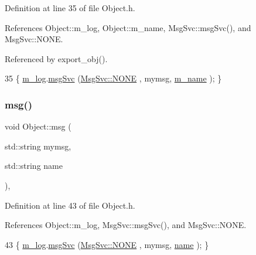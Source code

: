 Definition at line 35 of file Object.\+h.



References Object\+::m\+\_\+log, Object\+::m\+\_\+name, Msg\+Svc\+::msg\+Svc(), and Msg\+Svc\+::\+N\+O\+NE.



Referenced by export\+\_\+obj().


\begin{DoxyCode}
35 \{ \hyperlink{classObject_a0d269813dd7ac1f24bc143031e2963f2}{m\_log}.\hyperlink{classMsgSvc_ad25f18047920cc59a314e5098259711c}{msgSvc} (\hyperlink{classMsgSvc_ae671eb7301996cd049d2da8a65925926a9be9ae32fed8e1e6eba4a58692210fbd}{MsgSvc::NONE}    , mymsg, \hyperlink{classObject_a8b83c95c705d2c3ba0d081fe1710f48d}{m\_name} ); \}
\end{DoxyCode}
\mbox{\label{classObject_ac5d59299273cee27aacf7de00d2e7034}} 
\subsubsection{\texorpdfstring{msg()}{msg()}\hspace{0.1cm}{\footnotesize\ttfamily [2/2]}}
{\footnotesize\ttfamily void Object\+::msg (\begin{DoxyParamCaption}\item[{std\+::string}]{mymsg,  }\item[{std\+::string}]{name }\end{DoxyParamCaption})\hspace{0.3cm}{\ttfamily [inline]}, {\ttfamily [inherited]}}



Definition at line 43 of file Object.\+h.



References Object\+::m\+\_\+log, Msg\+Svc\+::msg\+Svc(), and Msg\+Svc\+::\+N\+O\+NE.


\begin{DoxyCode}
43 \{ \hyperlink{classObject_a0d269813dd7ac1f24bc143031e2963f2}{m\_log}.\hyperlink{classMsgSvc_ad25f18047920cc59a314e5098259711c}{msgSvc} (\hyperlink{classMsgSvc_ae671eb7301996cd049d2da8a65925926a9be9ae32fed8e1e6eba4a58692210fbd}{MsgSvc::NONE}    , mymsg, \hyperlink{classObject_a300f4c05dd468c7bb8b3c968868443c1}{name} ); \}
\end{DoxyCode}
\mbox{\label{classObject_a3f9d5537ebce0c0f2bf6ae4d92426f3c}} 
